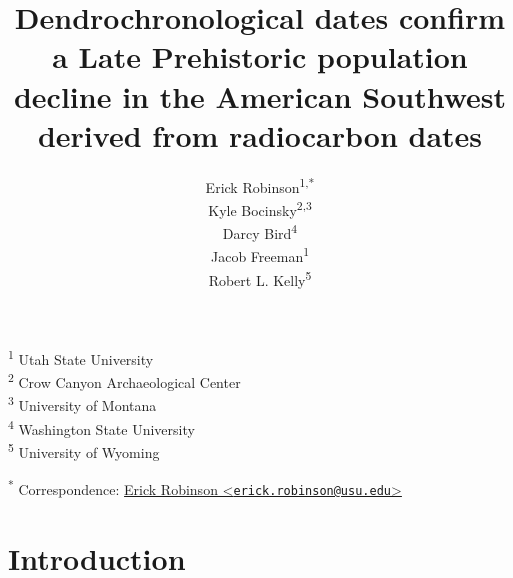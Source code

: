 \documentclass[
]{sa}
\author{
Erick Robinson\textsuperscript{1,*}

\And
Kyle Bocinsky\textsuperscript{2,3}

\And
Darcy Bird\textsuperscript{4}

\And
Jacob Freeman\textsuperscript{1}

\And
Robert L. Kelly\textsuperscript{5}

}
\title{Dendrochronological dates confirm a Late Prehistoric population decline in the American Southwest derived from radiocarbon dates}
\begin{document}
\textsuperscript{1} Utah State University\\
\textsuperscript{2} Crow Canyon Archaeological Center\\
\textsuperscript{3} University of Montana\\
\textsuperscript{4} Washington State University\\
\textsuperscript{5} University of Wyoming

\textsuperscript{*} Correspondence: \href{mailto:erick.robinson@usu.edu}{Erick Robinson \textless{}\href{mailto:erick.robinson@usu.edu}{\nolinkurl{erick.robinson@usu.edu}}\textgreater{}}

\newpage

\hypertarget{introduction}{%
\section*{Introduction}\label{introduction}}
\end{document}
